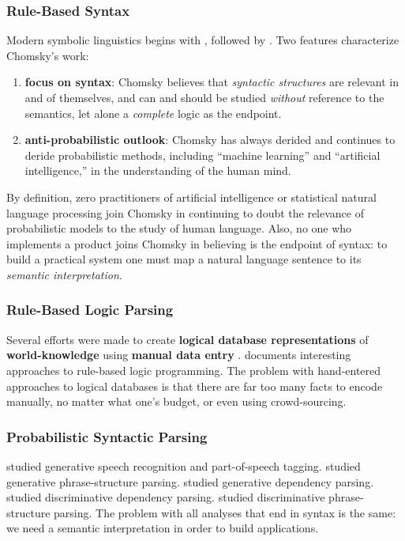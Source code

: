 \documentclass[12pt]{article}
\begin{document}
\subsubsection{Rule-Based Syntax}
Modern symbolic linguistics begins with \cite{Chomsky1957SyntacticStructures}, followed by \citep{Chomsky1981GovernmentAndBinding, Chomsky1995MinimalistProgram}.
Two features characterize Chomsky's work:
\begin{enumerate}
    \item {\bf focus on syntax}: Chomsky believes that {\em syntactic structures} are relevant in and of themselves, and can and should be studied {\em without} reference to the semantics, let alone a {\em complete} logic as the endpoint.
    \item {\bf anti-probabilistic outlook}: Chomsky has always derided and continues to deride probabilistic methods, including ``machine learning'' and ``artificial intelligence,'' in the understanding of the human mind.
\end{enumerate}
By definition, zero practitioners of artificial intelligence or statistical natural language processing join Chomsky in continuing to doubt the relevance of probabilistic models to the study of human language.
Also, no one who implements a product joins Chomsky in believing is the endpoint of syntax: to build a practical system one must map a natural language sentence to its {\em semantic interpretation}.

\subsubsection{Rule-Based Logic Parsing}
Several efforts were made to create {\bf logical database representations} of {\bf world-knowledge} using {\bf manual data entry} \cite{lenat1990blk,wiki:freebase}.
\cite{pereira1987prolog} documents interesting approaches to rule-based logic programming.
The problem with hand-entered approaches to logical databases is that there are far too many facts to encode manually, no matter what one's budget, or even using crowd-sourcing.

\subsubsection{Probabilistic Syntactic Parsing}
\cite{rabiner1986maximum, rabiner1989tutorial, Jelinek1997} studied  generative speech recognition and part-of-speech tagging.
\cite{collins1999head, charniak1997statistical} studied generative phrase-structure parsing.
\cite{eisner1996bilexical} studied generative dependency parsing.
\cite{mcdonald2006online, mcdonald2005non} studied discriminative dependency parsing.
\cite{charniak-johnson-2005-coarse, huang-chiang-2007-forest} studied discriminative phrase-structure parsing.
The problem with all analyses that end in syntax is the same: we need a semantic interpretation in order to build applications.
\end{document}
